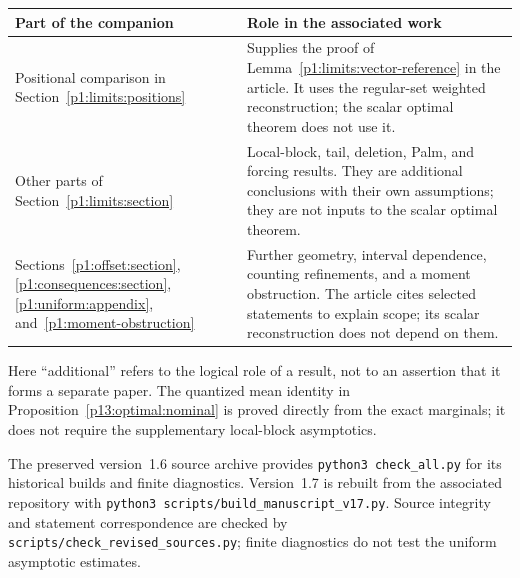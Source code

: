 \begin{center}
\small
\begin{tabularx}{\textwidth}{@{}>{\raggedright\arraybackslash}p{}>{\raggedright\arraybackslash}X@{}}
\toprule
Part of the companion & Role in the associated work\\
\midrule
Positional comparison in
Section~\ref{p1:limits:positions}
& Supplies the proof of Lemma~\ref{p1:limits:vector-reference}
in the article. It uses the regular-set weighted reconstruction;
the scalar optimal theorem does not use it.\\[4pt]
Other parts of Section~\ref{p1:limits:section}
& Local-block, tail, deletion, Palm, and forcing results.
They are additional conclusions with their own assumptions;
they are not inputs to the scalar optimal theorem.\\[4pt]
Sections~\ref{p1:offset:section},
\ref{p1:consequences:section}, \ref{p1:uniform:appendix},
and~\ref{p1:moment-obstruction}
& Further geometry, interval dependence, counting refinements,
and a moment obstruction. The article cites selected statements
to explain scope; its scalar reconstruction does not depend on them.\\
\bottomrule
\end{tabularx}
\end{center}

Here ``additional'' refers to the logical role of a result, not
to an assertion that it forms a separate paper. The quantized
mean identity in Proposition~\ref{p13:optimal:nominal} is proved
directly from the exact marginals; it does not require the
supplementary local-block asymptotics.

The preserved version~1.6 source archive provides
\texttt{python3 check\_all.py} for its historical builds and finite
diagnostics. Version~1.7 is rebuilt from the associated repository with
\texttt{python3 scripts/build\_manuscript\_v17.py}.
Source integrity and statement correspondence are checked by
\texttt{scripts/check\_revised\_sources.py}; finite diagnostics
do not test the uniform asymptotic estimates.
